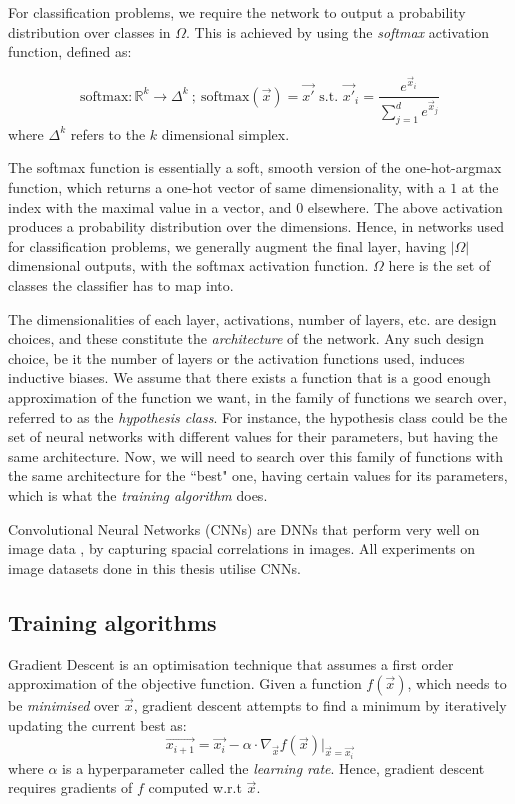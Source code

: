\documentclass{ociamthesis}
\begin{document}
For classification problems, we require the network to output a probability
distribution over classes in $\Omega$. This is achieved by using the
\emph{softmax} activation function, defined as:

\begin{equation*}
    \text{softmax}: \mathbb{R}^k \to \Delta^k~;~
    \text{softmax}(\vec{x}) = \vec{x'} \text{ s.t. } 
    \vec{x'}_i = \frac{e^{\vec{x}_i}}{\sum_{j=1}^{d}e^{\vec{x}_j}}
\end{equation*}
where $\Delta^k$ refers to the $k$ dimensional simplex.

The softmax function is essentially a soft, smooth version of the one-hot-argmax
function, which returns a one-hot vector of same dimensionality, with a $1$ at
the index with the maximal value in a vector, and 0 elsewhere. The above
activation produces a probability distribution over the dimensions. Hence, in
networks used for classification problems, we generally augment the final layer,
having $|\Omega|$ dimensional outputs, with the softmax activation function.
$\Omega$ here is the set of classes the classifier has to map into.

The dimensionalities of each layer, activations, number of layers, etc. are
design choices, and these constitute the \emph{architecture} of the network. Any
such design choice, be it the number of layers or the activation functions used,
induces inductive biases. We assume that there exists a function that is a good
enough approximation of the function we want, in the family of functions we
search over, referred to as the \emph{hypothesis class}. For instance, the
hypothesis class could be the set of neural networks with different values for
their parameters, but having the same architecture. Now, we will need to search
over this family of functions with the same architecture for the ``best" one,
having certain values for its parameters, which is what the \emph{training
algorithm} does.


Convolutional Neural Networks (CNNs) are DNNs that perform very well on image
data \citep{imagenet,neco.1989.1.4.541}, by capturing spacial correlations in
images. All experiments on image datasets done in this thesis utilise CNNs.

\subsection{Training algorithms}
\label{section:sgd}
Gradient Descent is an optimisation technique that assumes a first order
approximation of the objective function. Given a function $f(\vec{x})$, which
needs to be \emph{minimised} over $\vec{x}$, gradient descent attempts to find a
minimum by iteratively updating the current best as:
\begin{equation*}
    \vec{x_{i+1}}
    = \vec{x_i} -
        \alpha \cdot \nabla_\vec{x} f(\vec{x}) \bigr \rvert _{\vec{x}=\vec{x_i}}
\end{equation*}
where $\alpha$ is a hyperparameter called the \emph{learning rate}. Hence,
gradient descent requires gradients of $f$ computed w.r.t $\vec{x}$.
\end{document}
